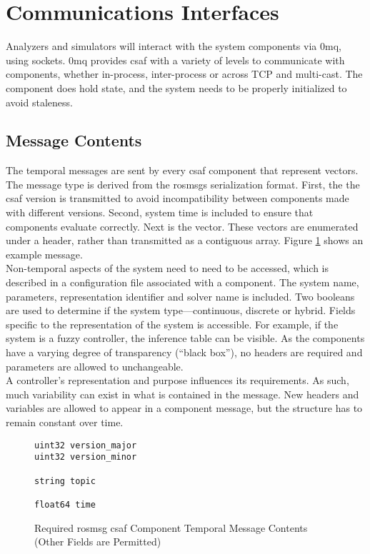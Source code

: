 \section{Communications Interfaces}

Analyzers and simulators will interact with the system components via \acrshort{0mq}, using sockets. \acrshort{0mq} 
provides \acrshort{csaf}  with a variety of levels to communicate with components, whether in-process, 
inter-process or across TCP and multi-cast. The component does hold state, and the system needs to be 
properly initialized to avoid staleness.

\subsection{Message Contents}

The temporal messages are sent by every \acrshort{csaf}  component that represent vectors. The message type is derived from the \acrshort{ros}msgs serialization format. First, the the 
\acrshort{csaf}  version is transmitted to avoid incompatibility between components made with different 
versions. Second, system time is included to ensure that components evaluate  
correctly. Next is the vector. These vectors are enumerated under a header, rather than transmitted as a 
contiguous array. Figure \ref{fig:cmsg} shows an example message. \\

Non-temporal aspects of the system need to need to be accessed, which is described in a configuration file associated with a component. The system name, parameters, representation identifier and solver name is included. Two booleans are used to determine if the system type---continuous, discrete or hybrid.  Fields specific to the representation of the system is  accessible. For example, if the system is a fuzzy controller, the inference table can be visible. As the  components have a varying degree of transparency (``black box''), no headers are required and parameters are allowed to unchangeable. \\

A controller's representation and purpose influences its requirements. As such, much 
variability can exist in what is contained in the message. New headers and variables are allowed to appear in a 
component message, but the structure has to remain constant over time. \\

\begin{figure}
\begin{lstlisting}
uint32 version_major
uint32 version_minor

string topic

float64 time
\end{lstlisting}
\caption{Required \acrshort{ros}msg \acrshort{csaf}  Component Temporal Message Contents (Other Fields are Permitted)}
\label{fig:cmsg}
\end{figure}

